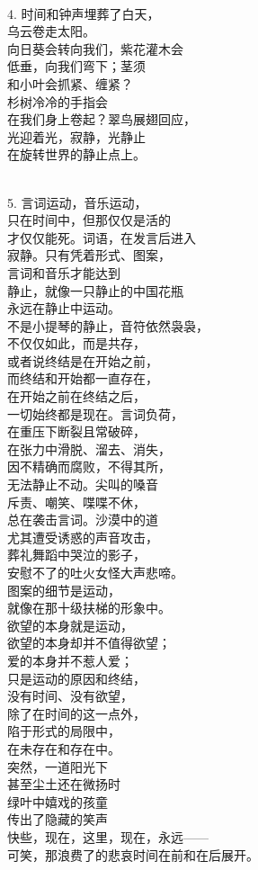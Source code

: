 \documentclass{article}
\begin{document}
 \\
4. 时间和钟声埋葬了白天，\\
乌云卷走太阳。
\newpage
\\
向日葵会转向我们，紫花灌木会\\
低垂，向我们弯下；茎须\\
和小叶会抓紧、缠紧？\\
杉树冷冷的手指会\\
在我们身上卷起？翠鸟展翅回应，\\
光迎着光，寂静，光静止\\
在旋转世界的静止点上。 

 \\
5. 言词运动，音乐运动，\\
只在时间中，但那仅仅是活的\\
才仅仅能死。词语，在发言后进入\\
寂静。只有凭着形式、图案，\\
言词和音乐才能达到\\
静止，就像一只静止的中国花瓶\\
永远在静止中运动。\\
不是小提琴的静止，音符依然袅袅，\\
不仅仅如此，而是共存，\\
或者说终结是在开始之前，\\
而终结和开始都一直存在，\\
在开始之前在终结之后，\\
一切始终都是现在。言词负荷，\\
在重压下断裂且常破碎，
\newpage
\\
在张力中滑脱、溜去、消失，\\
因不精确而腐败，不得其所，\\
无法静止不动。尖叫的嗓音\\
斥责、嘲笑、喋喋不休，\\
总在袭击言词。沙漠中的道\\
尤其遭受诱惑的声音攻击，\\
葬礼舞蹈中哭泣的影子，\\
安慰不了的吐火女怪大声悲啼。\\
图案的细节是运动，\\
就像在那十级扶梯的形象中。\\
欲望的本身就是运动，\\
欲望的本身却并不值得欲望；\\
爱的本身并不惹人爱；\\
只是运动的原因和终结，\\
没有时间、没有欲望，\\
除了在时间的这一点外，\\
陷于形式的局限中，\\
在未存在和存在中。\\
突然，一道阳光下\\
甚至尘土还在微扬时\\
绿叶中嬉戏的孩童
\newpage
\\
传出了隐藏的笑声\\
快些，现在，这里，现在，永远——\\
可笑，那浪费了的悲哀时间在前和在后展开。
\end{document}
